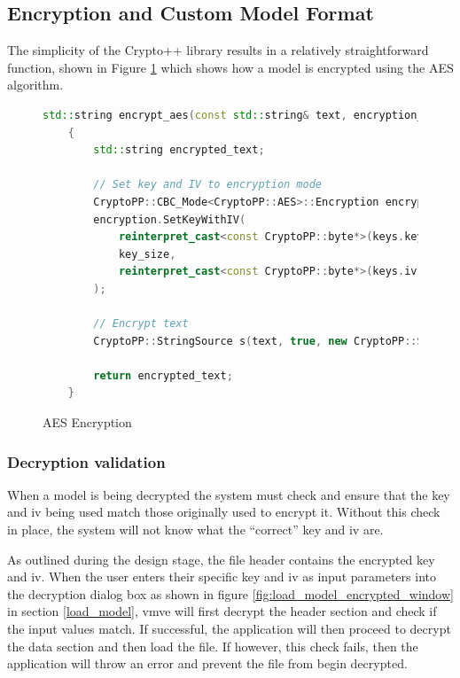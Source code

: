 \documentclass[11pt]{article}
\begin{document}
\subsection{Encryption and Custom Model Format}
The simplicity of the Crypto++ library results in a relatively straightforward
function, shown in Figure \ref{fig:aes_encryption} which shows how a model is
encrypted using the AES algorithm.
\begin{figure}[H]
  \centering
  \begin{lstlisting}[language=C++]
    std::string encrypt_aes(const std::string& text, encryption_keys& keys, int key_size)
    {
        std::string encrypted_text;

        // Set key and IV to encryption mode
        CryptoPP::CBC_Mode<CryptoPP::AES>::Encryption encryption;
        encryption.SetKeyWithIV(
            reinterpret_cast<const CryptoPP::byte*>(keys.key.data()), 
            key_size, 
            reinterpret_cast<const CryptoPP::byte*>(keys.iv.data())
        );

        // Encrypt text
        CryptoPP::StringSource s(text, true, new CryptoPP::StreamTransformationFilter(encryption, new CryptoPP::StringSink(encrypted_text)));

        return encrypted_text;
    }
  \end{lstlisting}
  \caption{AES Encryption}
  \label{fig:aes_encryption}
\end{figure}


\subsubsection{Decryption validation}
When a model is being decrypted the system must check and ensure that the key
and iv being used match those originally used to encrypt it. Without this check
in place, the system will not know what the ``correct'' key and iv are.

As outlined during the design stage, the file header contains the encrypted key
and iv. When the user enters their specific key and iv as input parameters into
the decryption dialog box as shown in figure
\ref{fig:load_model_encrypted_window} in section \ref{load_model}, \gls*{vmve}
will first decrypt the header section and check if the input values match. If
successful, the application will then proceed to decrypt the data section and
then load the file. If however, this check fails, then the application will
throw an error and prevent the file from begin decrypted.
\end{document}
